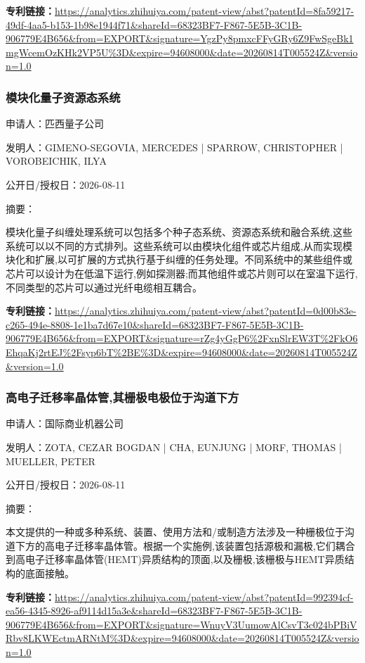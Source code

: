 \documentclass[12pt,a4paper]{ctexart}
\begin{document}
\noindent\textbf{专利链接：}\url{https://analytics.zhihuiya.com/patent-view/abst?patentId=8fa59217-49df-4aa5-b153-1b98e1944f71&shareId=68323BF7-F867-5E5B-3C1B-906779E4B656&from=EXPORT&signature=YgzPy8pmxcFFyGRy6Z9FwSgeBk1mgWcemOzKHk2VP5U%3D&expire=94608000&date=20260814T005524Z&version=1.0}

\subsubsection{ 模块化量子资源态系统 }

申请人：匹西量子公司

发明人：GIMENO-SEGOVIA, MERCEDES | SPARROW, CHRISTOPHER | VOROBEICHIK, ILYA

公开日/授权日：2026-08-11

摘要：

模块化量子纠缠处理系统可以包括多个种子态系统、资源态系统和融合系统,这些系统可以以不同的方式排列。这些系统可以由模块化组件或芯片组成,从而实现模块化和扩展,以可扩展的方式执行基于纠缠的任务处理。不同系统中的某些组件或芯片可以设计为在低温下运行,例如探测器;而其他组件或芯片则可以在室温下运行,不同类型的芯片可以通过光纤电缆相互耦合。

\noindent\textbf{专利链接：}\url{https://analytics.zhihuiya.com/patent-view/abst?patentId=0d00b83e-c265-494e-8808-1e1ba7d67e10&shareId=68323BF7-F867-5E5B-3C1B-906779E4B656&from=EXPORT&signature=rZg4yGgP6%2FxnSlrEW3T%2FkO6EhqaKj2rtEJ%2Fsyp6bT%2BE%3D&expire=94608000&date=20260814T005524Z&version=1.0}

\subsubsection{ 高电子迁移率晶体管,其栅极电极位于沟道下方 }

申请人：国际商业机器公司

发明人：ZOTA, CEZAR BOGDAN | CHA, EUNJUNG | MORF, THOMAS | MUELLER, PETER

公开日/授权日：2026-08-11

摘要：

本文提供的一种或多种系统、装置、使用方法和/或制造方法涉及一种栅极位于沟道下方的高电子迁移率晶体管。根据一个实施例,该装置包括源极和漏极,它们耦合到高电子迁移率晶体管(HEMT)异质结构的顶面,以及栅极,该栅极与HEMT异质结构的底面接触。

\noindent\textbf{专利链接：}\url{https://analytics.zhihuiya.com/patent-view/abst?patentId=992394cf-ea56-4345-8926-af9114d15a3e&shareId=68323BF7-F867-5E5B-3C1B-906779E4B656&from=EXPORT&signature=WnuyV3UumowAlCsvT3c024bPBiVRbv8LKWEctmARNtM%3D&expire=94608000&date=20260814T005524Z&version=1.0}
\end{document}
